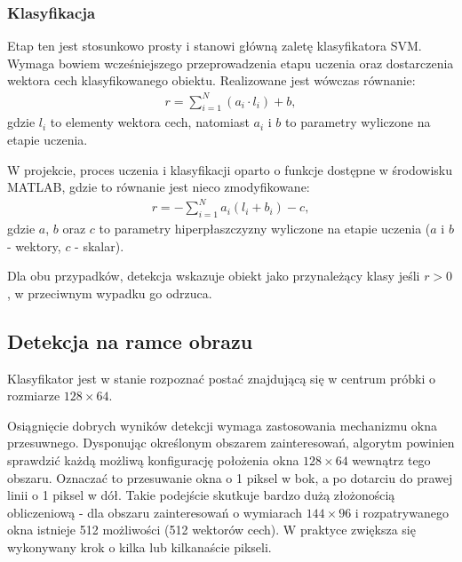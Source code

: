\subsubsection{Klasyfikacja}
\label{sec:klasyfikacja}
Etap ten jest stosunkowo prosty i stanowi główną zaletę klasyfikatora SVM. 
Wymaga bowiem wcześniejszego przeprowadzenia etapu uczenia oraz dostarczenia wektora cech klasyfikowanego obiektu. 
Realizowane jest wówczas równanie:
\begin{equation}
\label{eq:HOG_classification}
\left.\begin{aligned} 
r=\sum_{i=1}^{N}(a_i\cdot l_i)+b,
\end{aligned}\right.
\end{equation}
gdzie $l_i$ to elementy wektora cech, natomiast $a_i$ i $b$ to parametry wyliczone na etapie uczenia. 

W projekcie, proces uczenia i klasyfikacji oparto o funkcje dostępne w środowisku MATLAB, gdzie to równanie jest nieco zmodyfikowane:
\begin{equation}
\label{eq:HOG_classificationMATLAB}
\left.\begin{aligned} 
r=-\sum_{i=1}^{N}a_i(l_i+b_i)-c,
\end{aligned}\right.
\end{equation}
gdzie $a$, $b$ oraz $c$ to parametry hiperpłaszczyzny wyliczone na etapie uczenia ($a$ i $b$ - wektory, $c$ - skalar).

Dla obu przypadków, detekcja wskazuje obiekt jako przynależący klasy jeśli $r>0$, w przeciwnym wypadku go odrzuca.

\subsection{Detekcja na ramce obrazu}

Klasyfikator jest w stanie rozpoznać postać znajdującą się w centrum próbki o rozmiarze $128\times 64$. 

Osiągnięcie dobrych wyników detekcji wymaga zastosowania mechanizmu okna przesuwnego. Dysponując określonym obszarem zainteresowań, algorytm powinien sprawdzić każdą możliwą konfigurację położenia okna $128\times 64$ wewnątrz tego obszaru. Oznaczać to przesuwanie okna o 1 piksel w bok, a po dotarciu do prawej linii o 1 piksel w dół. Takie podejście skutkuje bardzo dużą złożonością obliczeniową - dla obszaru zainteresowań o wymiarach $144\times 96$ i rozpatrywanego okna istnieje 512 możliwości (512 wektorów cech). W praktyce zwiększa się wykonywany krok o kilka lub kilkanaście pikseli.

